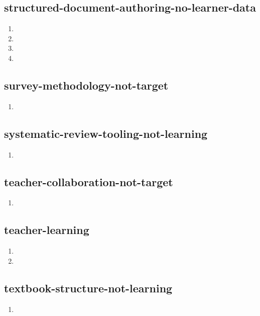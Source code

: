 \documentclass{article}
\begin{document}
\subsection{structured-document-authoring-no-learner-data}
\begin{enumerate}
\item {}
\item {}
\item {}
\item {}
\end{enumerate}

\subsection{survey-methodology-not-target}
\begin{enumerate}
\item {}
\end{enumerate}

\subsection{systematic-review-tooling-not-learning}
\begin{enumerate}
\item {}
\end{enumerate}

\subsection{teacher-collaboration-not-target}
\begin{enumerate}
\item {}
\end{enumerate}

\subsection{teacher-learning}
\begin{enumerate}
\item {}
\item {}
\end{enumerate}

\subsection{textbook-structure-not-learning}
\begin{enumerate}
\item {}
\end{enumerate}
\end{document}
